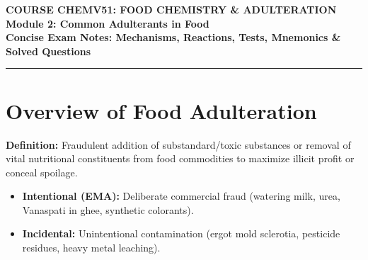 \documentclass[10pt,a4paper,oneside]{article}
\begin{document}
\begin{center}
    {\large \bfseries \color{secondaryteal} COURSE CHEMV51: FOOD CHEMISTRY \& ADULTERATION}\\[0.15cm]
    {\LARGE \bfseries \color{primarynavy} Module 2: Common Adulterants in Food}\\[0.15cm]
    {\normalsize \color{darkslate}\textbf{Concise Exam Notes: Mechanisms, Reactions, Tests, Mnemonics \& Solved Questions}}\\[0.25cm]
    \rule{\linewidth}{1.2pt}
\end{center}

\vspace{-0.2cm}

\section{Overview of Food Adulteration}

\textbf{Definition:} Fraudulent addition of substandard/toxic substances or removal of vital nutritional constituents from food commodities to maximize illicit profit or conceal spoilage.
\begin{itemize}
    \item \textbf{Intentional (EMA):} Deliberate commercial fraud (watering milk, urea, Vanaspati in ghee, synthetic colorants).
    \item \textbf{Incidental:} Unintentional contamination (ergot mold sclerotia, pesticide residues, heavy metal leaching).
\end{itemize}

\vspace{0.2cm}
\end{document}

